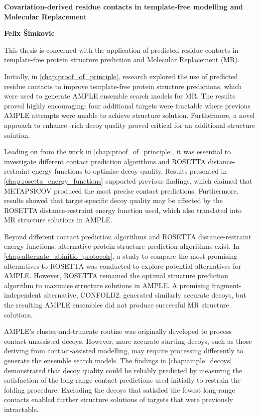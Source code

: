 \singlespacing
\begin{center}
    \Large
    \textbf{Covariation-derived residue contacts in template-free modelling and Molecular Replacement}

    \vspace{0.5cm}
    \large
    \textbf{Felix \v{S}imkovic}
    \vspace{0.5cm}
\end{center}

This thesis is concerned with the application of predicted residue contacts in template-free protein structure prediction and Molecular Replacement (MR).

Initially, in \cref{chap:proof_of_principle}, research explored the use of predicted residue contacts to improve template-free protein structure predictions, which were used to generate AMPLE ensemble search models for MR. The results proved highly encouraging: four additional targets were tractable where previous AMPLE attempts were unable to achieve structure solution. Furthermore, a novel approach to enhance \textbeta-rich decoy quality proved critical for an additional structure solution. 

Leading on from the work in \cref{chap:proof_of_principle}, it was essential to investigate different contact prediction algorithms and ROSETTA distance-restraint energy functions to optimise decoy quality. Results presented in \cref{chap:rosetta_energy_functions} supported previous findings, which claimed that METAPSICOV produced the most precise contact predictions. Furthermore, results showed that target-specific decoy quality may be affected by the ROSETTA distance-restraint energy function used, which also translated into MR structure solutions in AMPLE.

Beyond different contact prediction algorithms and ROSETTA distance-restraint energy functions, alternative protein structure prediction algorithms exist. In \cref{chap:alternate_abinitio_protocols}, a study to compare the most promising alternatives to ROSETTA was conducted to explore potential alternatives for AMPLE. However, ROSETTA remained the optimal structure prediction algorithm to maximise structure solutions in AMPLE. A promising fragment-independent alternative, CONFOLD2, generated similarly accurate decoys, but the resulting AMPLE ensembles did not produce successful MR structure solutions.

AMPLE's cluster-and-truncate routine was originally developed to process contact-unassisted decoys. However, more accurate starting decoys, such as those deriving from contact-assisted modelling, may require processing differently to generate the ensemble search models. The findings in \cref{chap:ample_decoys} demonstrated that decoy quality could be reliably predicted by measuring the satisfaction of the long-range contact predictions used initially to restrain the folding procedure. Excluding the decoys that satisfied the fewest long-range contacts enabled further structure solutions of targets that were previously intractable.


